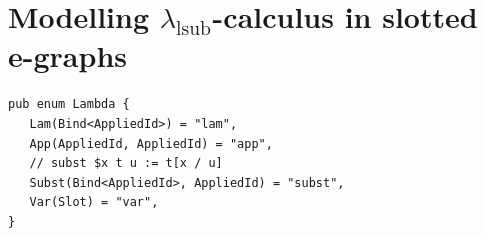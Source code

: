 \section{Modelling \texorpdfstring{$\lambda_{\text{lsub}}$-}{linear substitution }calculus in slotted e-graphs}%
\label{sec:e-graph-explicit-subst}


\begin{listing}
	\begin{verbatim}
pub enum Lambda {
   Lam(Bind<AppliedId>) = "lam",
   App(AppliedId, AppliedId) = "app",
   // subst $x t u := t[x / u]
   Subst(Bind<AppliedId>, AppliedId) = "subst",
   Var(Slot) = "var",
}
	\end{verbatim}
	\caption{$\lambda_{\text{lsub}}$ syntax definition in slotted e-graphs}
	\label{listing:define_language}
\end{listing}


